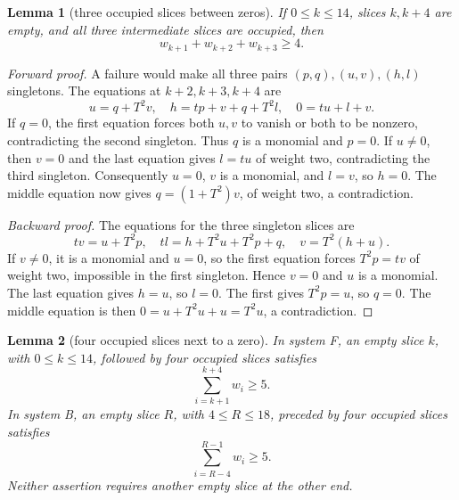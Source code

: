 \documentclass{article}
\newtheorem{lemma}{Lemma}
\begin{document}
\begin{lemma}[three occupied slices between zeros]\label{lem:three}
  If \(0 \le k \le 14\), slices \(k, k + 4\) are empty, and all three intermediate slices are
  occupied, then
  \begin{equation}
    w_{k+1} + w_{k+2} + w_{k+3} \ge 4.
  \end{equation}
\end{lemma}

\begin{proof}[Forward proof]
  A failure would make all three pairs \((p,q), (u,v), (h,l)\) singletons. The equations at
  \(k + 2, k + 3, k + 4\) are
  \begin{equation}
    u = q + T^2 v, \quad h = tp + v + q + T^2 l, \quad 0 = tu + l + v.
  \end{equation}
  If \(q = 0\), the first equation forces both \(u, v\) to vanish or both to be nonzero,
  contradicting the second singleton. Thus \(q\) is a monomial and \(p = 0\). If \(u \ne 0\),
  then \(v = 0\) and the last equation gives \(l = tu\) of weight two, contradicting the third
  singleton. Consequently \(u = 0\), \(v\) is a monomial, and \(l = v\), so \(h = 0\). The middle
  equation now gives \(q = (1 + T^2) v\), of weight two, a contradiction.

  \emph{Backward proof.} The equations for the three singleton slices are
  \begin{equation}
    tv = u + T^2 p, \quad tl = h + T^2 u + T^2 p + q, \quad v = T^2 (h + u).
  \end{equation}
  If \(v \ne 0\), it is a monomial and \(u = 0\), so the first equation forces \(T^2 p = tv\) of
  weight two, impossible in the first singleton. Hence \(v = 0\) and \(u\) is a monomial. The
  last equation gives \(h = u\), so \(l = 0\). The first gives \(T^2 p = u\), so \(q = 0\). The
  middle equation is then \(0 = u + T^2 u + u = T^2 u\), a contradiction.
\end{proof}

\begin{lemma}[four occupied slices next to a zero]\label{lem:four}
  In system F, an empty slice \(k\), with \(0 \le k \le 14\), followed by four occupied slices
  satisfies
  \begin{equation}
    \sum_{i=k+1}^{k+4} w_i \ge 5.
  \end{equation}
  In system B, an empty slice \(R\), with \(4 \le R \le 18\), preceded by four occupied slices
  satisfies
  \begin{equation}
    \sum_{i=R-4}^{R-1} w_i \ge 5.
  \end{equation}
  Neither assertion requires another empty slice at the other end.
\end{lemma}
\end{document}
